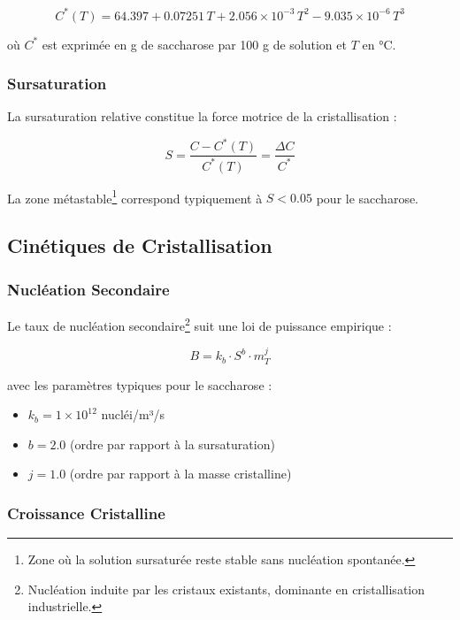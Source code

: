 \documentclass[12pt,a4paper,twoside]{article}
\begin{document}
\begin{equation}
\boxed{C^*(T) = 64.397 + 0.07251 \, T + 2.056 \times 10^{-3} \, T^2 - 9.035 \times 10^{-6} \, T^3}
\label{eq:solubility}
\end{equation}

où $C^*$ est exprimée en g de saccharose par 100 g de solution et $T$ en °C.

\subsubsection{Sursaturation}

La sursaturation relative constitue la force motrice de la cristallisation :

\begin{equation}
\boxed{S = \frac{C - C^*(T)}{C^*(T)} = \frac{\Delta C}{C^*}}
\label{eq:supersaturation}
\end{equation}

La zone métastable\footnote{Zone où la solution sursaturée reste stable sans nucléation spontanée.} correspond typiquement à $S < 0.05$ pour le saccharose.

\subsection{Cinétiques de Cristallisation}

\subsubsection{Nucléation Secondaire}

Le taux de nucléation secondaire\footnote{Nucléation induite par les cristaux existants, dominante en cristallisation industrielle.} suit une loi de puissance empirique :

\begin{equation}
\boxed{B = k_b \cdot S^b \cdot m_T^j}
\label{eq:nucleation}
\end{equation}

avec les paramètres typiques pour le saccharose :
\begin{itemize}[noitemsep]
    \item $k_b = 1 \times 10^{12}$ nucléi/m³/s
    \item $b = 2.0$ (ordre par rapport à la sursaturation)
    \item $j = 1.0$ (ordre par rapport à la masse cristalline)
\end{itemize}

\subsubsection{Croissance Cristalline}
\end{document}
